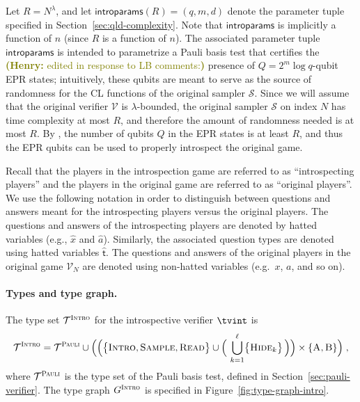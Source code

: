 \documentclass[11pt]{article}
\theoremstyle{definition}
\newcommand{\sampler}{\mathcal{S}}
\newcommand{\verifier}{\mathcal{V}}
\newcommand{\type}{\mathcal{T}}
\newcommand{\gamestyle}[1]{\ensuremath{\textsc{#1}}\xspace}
\newcommand{\pauli}{\gamestyle{Pauli}}
\newcommand{\intro}{\gamestyle{Intro}}
\newcommand{\labelstyle}[1]{\ensuremath{\textsc{#1}}\xspace}
\newcommand{\tvarstyle}[1]{\mathsf{#1}}
\newcommand{\tvar}{\ensuremath{\tvarstyle{t}}}
\newcommand{\alice}{\labelstyle{A}}
\newcommand{\bob}{\labelstyle{B}}
\newcommand{\ab}{\{\alice, \bob\}}
\newcommand{\typestyle}[1]{\ensuremath{\textsc{#1}}\xspace}
\newcommand{\Sample}{\typestyle{Sample}}
\newcommand{\Read}{\typestyle{Read}}
\newcommand{\Hide}[1]{\typestyle{Hide}_{#1}}
\newcommand{\Introspect}{\typestyle{Intro}}
\newcommand{\introparams}{\mathsf{introparams}}
\newcommand{\hnote}[1]{\textcolor{olive}{\small {\textbf{(Henry:} #1\textbf{) }}}}
\newcommand{\hnote}[1]{}
\begin{document}
Let $R = N^\lambda$, and let $\introparams(R) =
(q,m,d)$ denote the parameter tuple specified in
Section~\ref{sec:qld-complexity}.
Note that $\introparams$ is implicitly a function of $n$ (since $R$ is a
function of $n$).
The associated parameter tuple $\introparams$ is intended to parametrize a Pauli
basis test that certifies the \hnote{edited in response to LB comments:} presence of $Q = 2^m \log q$-qubit EPR states; intuitively, these qubits are meant to serve as the source of randomness for the CL functions of the
original sampler $\sampler$. Since we will assume that the original verifier $\verifier$ is $\lambda$-bounded, the original sampler $\sampler$ on index $N$ has time complexity at most $R$, and therefore the amount of randomness needed is at most $R$. By , the number of qubits $Q$ in the EPR states is at least $R$, and thus the EPR qubits can be used to properly introspect the original game. 

Recall that the players in the introspection game are referred to as
``introspecting players'' and the players in the original game are referred to
as ``original players''.
We use the following notation in order to distinguish between questions and
answers meant for the introspecting players versus the original players.
The questions and answers of the introspecting players are denoted by hatted
variables (e.g., $\hat{x}$ and $\hat{a}$).
Similarly, the associated question types are denoted using hatted variables
$\hat{\tvar}$.
The questions and answers of the original players in the original game
$\verifier_N$ are denoted using non-hatted variables (e.g.\ $x$, $a$, and so
on).

\paragraph{Types and type graph.}
The type set $\type^\intro$ for the introspective verifier $\tvint$ is
\begin{gather*}
  \type^\intro = \type^\pauli \cup \Big( \Big(\big\{ \Introspect, \Sample,
  \Read \big\} \cup \Big(\, \bigcup_{k=1}^{\ell} \bigl\{ \Hide{k} \bigr\} \,
  \Big) \Big) \times \ab \Big) \;,
\end{gather*}
where $\type^\pauli$ is the type set of the Pauli basis test, defined in
Section~\ref{sec:pauli-verifier}.
The type graph $G^\intro$ is specified in Figure~\ref{fig:type-graph-intro}.
\end{document}
